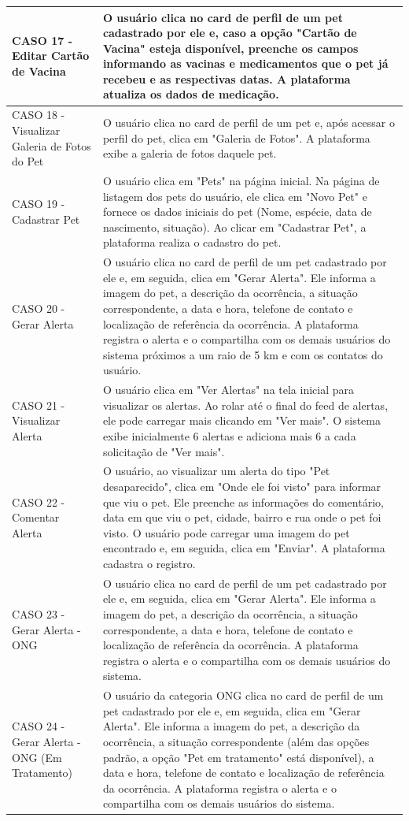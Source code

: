 \begin{longtable}{|p{4cm}|p{9cm}|}
    \hline
    CASO 17 - Editar Cartão de Vacina & O usuário clica no card de perfil de um pet cadastrado por ele e, caso a opção "Cartão de Vacina" esteja disponível, preenche os campos informando as vacinas e medicamentos que o pet já recebeu e as respectivas datas. A plataforma atualiza os dados de medicação.\\
    \hline
    CASO 18 - Visualizar Galeria de Fotos do Pet & O usuário clica no card de perfil de um pet e, após acessar o perfil do pet, clica em "Galeria de Fotos". A plataforma exibe a galeria de fotos daquele pet.\\
    \hline
    CASO 19 - Cadastrar Pet & O usuário clica em "Pets" na página inicial. Na página de listagem dos pets do usuário, ele clica em "Novo Pet" e fornece os dados iniciais do pet (Nome, espécie, data de nascimento, situação). Ao clicar em "Cadastrar Pet", a plataforma realiza o cadastro do pet.\\
    \hline
    CASO 20 - Gerar Alerta & O usuário clica no card de perfil de um pet cadastrado por ele e, em seguida, clica em "Gerar Alerta". Ele informa a imagem do pet, a descrição da ocorrência, a situação correspondente, a data e hora, telefone de contato e localização de referência da ocorrência. A plataforma registra o alerta e o compartilha com os demais usuários do sistema próximos a um raio de 5 km e com os contatos do usuário.\\
    \hline
    CASO 21 - Visualizar Alerta & O usuário clica em "Ver Alertas" na tela inicial para visualizar os alertas. Ao rolar até o final do feed de alertas, ele pode carregar mais clicando em "Ver mais". O sistema exibe inicialmente 6 alertas e adiciona mais 6 a cada solicitação de "Ver mais".\\
    \hline
    CASO 22 - Comentar Alerta & O usuário, ao visualizar um alerta do tipo "Pet desaparecido", clica em "Onde ele foi visto" para informar que viu o pet. Ele preenche as informações do comentário, data em que viu o pet, cidade, bairro e rua onde o pet foi visto. O usuário pode carregar uma imagem do pet encontrado e, em seguida, clica em "Enviar". A plataforma cadastra o registro.\\
    \hline
    CASO 23 - Gerar Alerta - ONG & O usuário clica no card de perfil de um pet cadastrado por ele e, em seguida, clica em "Gerar Alerta". Ele informa a imagem do pet, a descrição da ocorrência, a situação correspondente, a data e hora, telefone de contato e localização de referência da ocorrência. A plataforma registra o alerta e o compartilha com os demais usuários do sistema.\\
    \hline
    CASO 24 - Gerar Alerta - ONG (Em Tratamento) & O usuário da categoria ONG clica no card de perfil de um pet cadastrado por ele e, em seguida, clica em "Gerar Alerta". Ele informa a imagem do pet, a descrição da ocorrência, a situação correspondente (além das opções padrão, a opção "Pet em tratamento" está disponível), a data e hora, telefone de contato e localização de referência da ocorrência. A plataforma registra o alerta e o compartilha com os demais usuários do sistema.\\
    \hline
\end{longtable}

